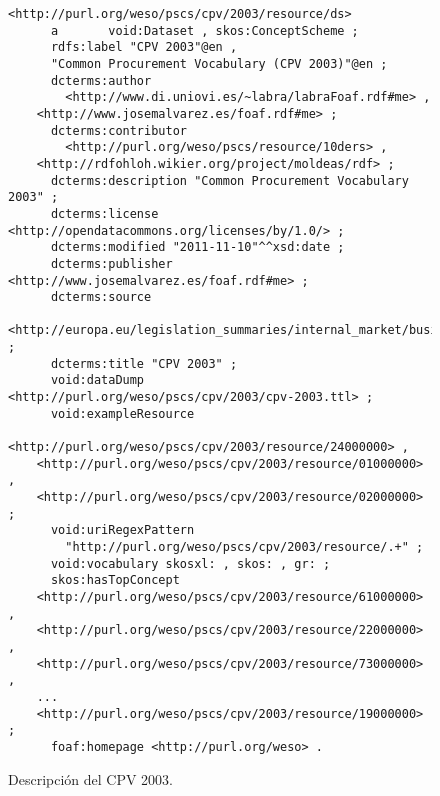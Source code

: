 

\begin{figure}[!htp]
\begin{lstlisting} 
<http://purl.org/weso/pscs/cpv/2003/resource/ds>
      a       void:Dataset , skos:ConceptScheme ;
      rdfs:label "CPV 2003"@en , 
	  "Common Procurement Vocabulary (CPV 2003)"@en ;
      dcterms:author 
        <http://www.di.uniovi.es/~labra/labraFoaf.rdf#me> , 
	<http://www.josemalvarez.es/foaf.rdf#me> ;
      dcterms:contributor
        <http://purl.org/weso/pscs/resource/10ders> ,
	<http://rdfohloh.wikier.org/project/moldeas/rdf> ; 
      dcterms:description "Common Procurement Vocabulary 2003" ;
      dcterms:license <http://opendatacommons.org/licenses/by/1.0/> ;
      dcterms:modified "2011-11-10"^^xsd:date ;
      dcterms:publisher <http://www.josemalvarez.es/foaf.rdf#me> ;
      dcterms:source 
	<http://europa.eu/legislation_summaries/internal_market/businesses/public_procurement/l22008_en.htm> ;
      dcterms:title "CPV 2003" ;
      void:dataDump <http://purl.org/weso/pscs/cpv/2003/cpv-2003.ttl> ;
      void:exampleResource
        <http://purl.org/weso/pscs/cpv/2003/resource/24000000> , 
	<http://purl.org/weso/pscs/cpv/2003/resource/01000000> , 
	<http://purl.org/weso/pscs/cpv/2003/resource/02000000> ;
      void:uriRegexPattern
        "http://purl.org/weso/pscs/cpv/2003/resource/.+" ;
      void:vocabulary skosxl: , skos: , gr: ;
      skos:hasTopConcept
	<http://purl.org/weso/pscs/cpv/2003/resource/61000000> , 
	<http://purl.org/weso/pscs/cpv/2003/resource/22000000> , 
	<http://purl.org/weso/pscs/cpv/2003/resource/73000000> ,
	...
	<http://purl.org/weso/pscs/cpv/2003/resource/19000000> ;
      foaf:homepage <http://purl.org/weso> .
\end{lstlisting}
	\caption{Descripción del \dataset CPV 2003.}
	\label{fig:pscs-ds-cpv-2003}
\end{figure}


